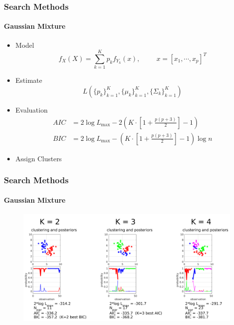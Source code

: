 \documentclass[aspectratio=169,10pt,t]{beamer}
\begin{document}
\begin{frame}[t]
	\frametitle{Search Methods}
	\framesubtitle{Gaussian Mixture}


	\begin{itemize}
		\item Model\\
			\[
				f _{X} \left( X \right)  =
				\sum^{K}_{k=1} 
				p_k f _{Y_k}  \left( x \right) ,
				\hspace{1cm}
				x = \left[ x_1, \cdots, x_p \right] ^{T}
			\] 
			\pause
		\item Estimate 
			\[
				L  \left( \{ p_k \} ^{K}_{k=1},
					\{ \mu_k \}^{K}_{k=1},
					\{ \Sigma_{k} \}^{K}_{k=1}
				\right) 
			\] 
			\pause
		\item Evaluation
			\[
				\begin{aligned}
					AIC &= 2 \log L _{\max} - 2
					\left( K \cdot  \left[ 1 + \frac{p \left( p+3 \right) }{2}  \right] -1  \right) \\
					BIC &= 2 \log L _{\max} -
					\left(  K \cdot  \left[ 1 + \frac{p \left( p+3 \right) }{2}  \right] -1  \right) 
					\log n
				\end{aligned}
			\] 
    \item Assign Clusters
	\end{itemize}


\end{frame}

\begin{frame}[t]
	\frametitle{Search Methods}
	\framesubtitle{Gaussian Mixture}
    
	\begin{figure}[h]
		\centering
		\includegraphics[width=0.8\linewidth]{images/gmm.png}
	\end{figure}

\end{frame}
\end{document}
